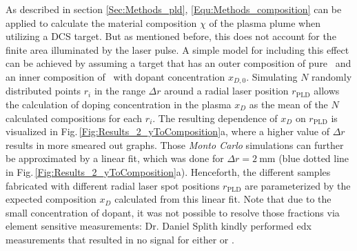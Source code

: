 As described in section \ref{Sec:Methods_pld}, \eqref{Equ:Methods_composition} can be applied to calculate the material composition $\chi$ of the plasma plume when utilizing a \gls{DCS} target.
But as mentioned before, this does not account for the finite area illuminated by the laser pulse.
A simple model for including this effect can be achieved by assuming a target that has an outer composition of pure \cro\ and an inner composition of \cro\ with dopant concentration $x_{D,0}$.
Simulating $N$ randomly distributed points $r_i$ in the range $\Delta r$ around a radial laser position $r_\mathrm{PLD}$ allows the calculation of doping concentration in the plasma $x_D$ as the mean of the $N$ calculated compositions for each $r_i$.
The resulting dependence of $x_D$ on $r_\mathrm{PLD}$ is visualized in Fig.\,\ref{Fig:Results_2_yToComposition}a, where a higher value of $\Delta r$ results in more smeared out graphs.
Those \emph{Monto Carlo} simulations can further be approximated by a linear fit, which was done for $\Delta r=\qty{2}{\mm}$ (blue dotted line in Fig.\,\ref{Fig:Results_2_yToComposition}a).
Henceforth, the different samples fabricated with different radial laser spot positions $r_\mathrm{PLD}$ are parameterized by the expected composition $x_D$ calculated from this linear fit.
Note that due to the small concentration of dopant, it was not possible to resolve those fractions via element sensitive measurements: Dr. Daniel Splith kindly performed \gls{edx} measurements that resulted in no signal for either  or .

